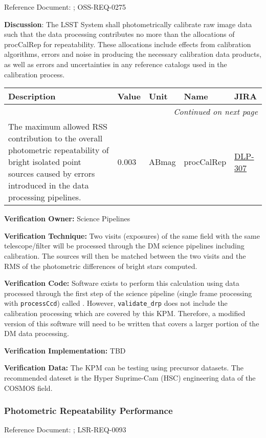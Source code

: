 \documentclass[DM,lsstdraft,toc]{lsstdoc}
\makeatletter
\newcommand{\jira}[1]{\href{https://jira.lsstcorp.org/browse/#1}{#1}}
\newenvironment{metric}[0]{%
\setlength\LTleft{0pt}
\setlength\LTright{\fill}
\begin{longtable}[]{@{}p{0.4\textwidth}lp{0.75in}p{1.3in}p{0.75in}@{}}

\hline \textbf{Description} & \textbf{Value} & \textbf{Unit} & \textbf{Name} & \textbf{JIRA} \\ \hline
\endhead

\hline \multicolumn{5}{r}{\emph{Continued on next page}} \\
\endfoot

\hline\hline
\endlastfoot
}{%
\hline
\end{longtable}
}
\makeatother
\begin{document}
Reference Document: ; OSS-REQ-0275

\textbf{Discussion}: The LSST System shall photometrically calibrate raw
image data such that the data processing contributes no more than the
allocations of procCalRep for repeatability. These allocations include
effects from calibration algorithms, errors and noise in producing the
necessary calibration data products, as well as errors and uncertainties
in any reference catalogs used in the calibration process.

\begin{metric}
The maximum allowed RSS contribution to the overall photometric
repeatability of bright isolated point sources caused by errors
introduced in the data processing pipelines. & 0.003 & ABmag &
procCalRep & \jira{DLP-307}\tabularnewline
\end{metric}

\textbf{Verification Owner:} Science Pipelines

\textbf{Verification Technique:} Two visits (exposures) of the same
field with the same telescope/filter will be processed through the DM
science pipelines including calibration. The sources will then be
matched between the two visits and the RMS of the photometric
differences of bright stars computed.

\textbf{Verification Code:} Software exists to perform this calculation
using data processed through the first step of the science pipeline
(single frame processing with \texttt{processCcd}) called . However, \texttt{validate\_drp}
does not include the calibration processing which are covered by this
KPM. Therefore, a modified version of this software will need to be
written that covers a larger portion of the DM data processing.

\textbf{Verification Implementation:} TBD

\textbf{Verification Data:} The KPM can be testing using precursor
datasets. The recommended dateset is the Hyper Suprime-Cam (HSC)
engineering data of the COSMOS field.

\subsubsection{Photometric Repeatability
Performance}\label{photometric-repeatability-performance}

Reference Document: ; LSR-REQ-0093
\end{document}
